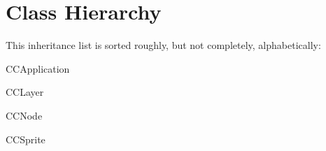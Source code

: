 \section{Class Hierarchy}
This inheritance list is sorted roughly, but not completely, alphabetically\-:\begin{DoxyCompactList}
\item C\-C\-Application\begin{DoxyCompactList}
\item {}
\end{DoxyCompactList}
\item C\-C\-Layer\begin{DoxyCompactList}
\item {}
\item {}
\end{DoxyCompactList}
\item C\-C\-Node\begin{DoxyCompactList}
\item {}
\end{DoxyCompactList}
\item C\-C\-Sprite\begin{DoxyCompactList}
\item {}
\item {}
\item {}
\end{DoxyCompactList}
\end{DoxyCompactList}
